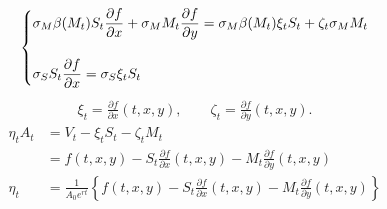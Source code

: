 \documentclass[12pt]{article}
\newenvironment{solution}[2][Solution]{\begin{trivlist}
\item[\hskip \labelsep {\bfseries #1}\hskip \labelsep {\bfseries #2.}]}{\end{trivlist}}
\newenvironment{question}[2][Question]{\begin{trivlist}
\item[\hskip \labelsep {\bfseries #1}\hskip \labelsep {\bfseries #2.}]}{\end{trivlist}}
\begin{document}
\newpage
\begin{question}{8}
\end{question}
\begin{solution}[Solution] \\ 
\begin{align*}
    \begin{dcases}
    \sigma_M \beta(M_t)S_t \frac{\partial f}{\partial x} + \sigma_M M_t\frac{\partial f}{\partial y} = \sigma_M \beta(M_t)\xi_t S_t + \zeta_t\sigma_M M_t \\[10pt]
    \sigma_S S_t \frac{\partial f}{\partial x} = \sigma_S \xi_t S_t 
    \end{dcases}
\end{align*}
\begin{align*}
    \xi_t = \frac{\partial f}{\partial x}(t,x,y), \qquad \zeta_t =\frac{\partial f}{\partial y}(t,x,y).
\end{align*}
\begin{align*}
    \eta_t A_t &= V_t - \xi_t S_t - \zeta_t M_t \\
    &= f(t,x,y) - S_t\frac{\partial f}{\partial x}(t,x,y) - M_t\frac{\partial f}{\partial y}(t,x,y)\\
    \eta_t &= \frac{1}{A_0 e^{rt}} \left\{f(t,x,y) - S_t\frac{\partial f}{\partial x}(t,x,y) - M_t\frac{\partial f}{\partial y}(t,x,y)\right\}
\end{align*}
\end{solution}
\ \\
\begin{question}{9}
\end{question}
\end{document}

